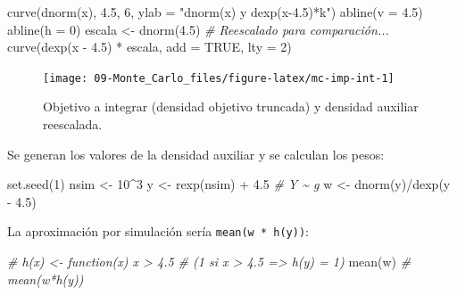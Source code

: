 \documentclass[
]{book}
\newenvironment{Shaded}{\begin{snugshade}}{\end{snugshade}}
\newcommand{\AttributeTok}[1]{\textcolor[rgb]{0.77,0.63,0.00}{#1}}
\newcommand{\CommentTok}[1]{\textcolor[rgb]{0.56,0.35,0.01}{\textit{#1}}}
\newcommand{\ConstantTok}[1]{\textcolor[rgb]{0.00,0.00,0.00}{#1}}
\newcommand{\DecValTok}[1]{\textcolor[rgb]{0.00,0.00,0.81}{#1}}
\newcommand{\FloatTok}[1]{\textcolor[rgb]{0.00,0.00,0.81}{#1}}
\newcommand{\FunctionTok}[1]{\textcolor[rgb]{0.00,0.00,0.00}{#1}}
\newcommand{\NormalTok}[1]{#1}
\newcommand{\OtherTok}[1]{\textcolor[rgb]{0.56,0.35,0.01}{#1}}
\newcommand{\SpecialCharTok}[1]{\textcolor[rgb]{0.00,0.00,0.00}{#1}}
\newcommand{\StringTok}[1]{\textcolor[rgb]{0.31,0.60,0.02}{#1}}
\theoremstyle{break}
\theoremstyle{definition}
\theoremstyle{definition}
\theoremstyle{definition}
\theoremstyle{definition}
\theoremstyle{remark}
\begin{document}
\begin{Shaded}
\begin{Highlighting}[]
\FunctionTok{curve}\NormalTok{(}\FunctionTok{dnorm}\NormalTok{(x), }\FloatTok{4.5}\NormalTok{, }\DecValTok{6}\NormalTok{, }\AttributeTok{ylab =} \StringTok{"dnorm(x) y dexp(x{-}4.5)*k"}\NormalTok{)}
\FunctionTok{abline}\NormalTok{(}\AttributeTok{v =} \FloatTok{4.5}\NormalTok{)}
\FunctionTok{abline}\NormalTok{(}\AttributeTok{h =} \DecValTok{0}\NormalTok{)}
\NormalTok{escala }\OtherTok{\textless{}{-}} \FunctionTok{dnorm}\NormalTok{(}\FloatTok{4.5}\NormalTok{)  }\CommentTok{\# Reescalado para comparación...}
\FunctionTok{curve}\NormalTok{(}\FunctionTok{dexp}\NormalTok{(x }\SpecialCharTok{{-}} \FloatTok{4.5}\NormalTok{) }\SpecialCharTok{*}\NormalTok{ escala, }\AttributeTok{add =} \ConstantTok{TRUE}\NormalTok{, }\AttributeTok{lty =} \DecValTok{2}\NormalTok{)  }
\end{Highlighting}
\end{Shaded}

\begin{figure}[!htb]

{\centering \texttt{[image: 09-Monte\_Carlo\_files/figure-latex/mc-imp-int-1]} 

}

\caption{Objetivo a integrar (densidad objetivo truncada) y densidad auxiliar reescalada.}\label{fig:mc-imp-int}
\end{figure}

Se generan los valores de la densidad auxiliar y se calculan los pesos:

\begin{Shaded}
\begin{Highlighting}[]
\FunctionTok{set.seed}\NormalTok{(}\DecValTok{1}\NormalTok{)}
\NormalTok{nsim }\OtherTok{\textless{}{-}} \DecValTok{10}\SpecialCharTok{\^{}}\DecValTok{3}
\NormalTok{y }\OtherTok{\textless{}{-}} \FunctionTok{rexp}\NormalTok{(nsim) }\SpecialCharTok{+} \FloatTok{4.5}    \CommentTok{\#  Y \textasciitilde{} g}
\NormalTok{w }\OtherTok{\textless{}{-}} \FunctionTok{dnorm}\NormalTok{(y)}\SpecialCharTok{/}\FunctionTok{dexp}\NormalTok{(y }\SpecialCharTok{{-}} \FloatTok{4.5}\NormalTok{)}
\end{Highlighting}
\end{Shaded}

La aproximación por simulación sería \texttt{mean(w\ *\ h(y))}:

\begin{Shaded}
\begin{Highlighting}[]
\CommentTok{\# h(x) \textless{}{-} function(x) x \textgreater{} 4.5  \# (1 si x \textgreater{} 4.5 =\textgreater{} h(y) = 1)}
\FunctionTok{mean}\NormalTok{(w) }\CommentTok{\# mean(w*h(y))}
\end{Highlighting}
\end{Shaded}
\end{document}
